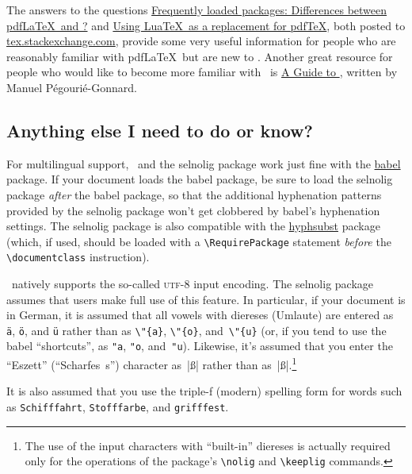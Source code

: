 \documentclass[12pt]{article}
\newcommand{\pkg}[1]{\textsf{#1}}
\newcommand{\cmmd}[1]{\texttt{\textbackslash #1}}
\begin{document}
The answers to the questions \href{http://tex.stackexchange.com/q/28642/5001}{Frequently loaded packages: Differences between pdf\LaTeX\ and \LuaLaTeX?} and \href{http://tex.stackexchange.com/q/32295/5001}{Using Lua\TeX\ as a replacement for pdf\TeX}, both posted to \href{http://tex.stackexchange.com/}{tex.stackexchange.com}, provide some very useful information for people who are reasonably familiar with pdf\LaTeX\ but are new to \LuaLaTeX. Another great resource for people who would like to become more familiar with \LuaLaTeX\ is  \href{http://mirror.ctan.org/info/luatex/lualatex-doc/lualatex-doc.pdf}{A Guide to \LuaLaTeX}, written by Manuel Pégourié-Gonnard.


\subsection{Anything else I need to do or know?} \label{sec:anythingelse}

For multilingual support, \LuaLaTeX\ and the \pkg{selnolig} package work just fine with the \href{http://www.ctan.org/pkg/babel}{\pkg{babel}} package. If your document loads the \pkg{babel} package, be sure to load the \pkg{selnolig} package \emph{after} the \pkg{babel} package, so that the additional hyphenation patterns provided by the \pkg{selnolig} package won't get clobbered by \pkg{babel}'s hyphenation settings. The \pkg{selnolig} package is also compatible with the \href{http://www.ctan.org/pkg/hyphsubst}{\pkg{hyphsubst}} package (which, if used, should be loaded with a \Verb+\RequirePackage+ statement \emph{before} the \Verb+\documentclass+ instruction).

\LuaLaTeX\ natively supports the so-called \textsc{utf}-8 input encoding. The \pkg{selnolig} package assumes that users make full use of this feature. In particular, if your document is in German, it is assumed that all vowels with diereses (Umlaute) are entered as \Verb|ä|, \Verb|ö|, and \Verb|ü| rather than as \Verb|\"{a}|, \Verb|\"{o}|, and~\Verb|\"{u}| (or, if you tend to use the \pkg{babel} \enquote{shortcuts}, as \Verb|"a|, \Verb|"o|, and~\Verb|"u|). Likewise, it's assumed that you enter the \enquote{Eszett} (\enquote{Scharfes~s}) character as~|ß| rather than as~|{\ss}|.\footnote{The use of the input characters with \enquote{built-in} diereses is actually required only for the operations of the package's \cmmd{nolig} and \cmmd{keeplig} commands.}

It is also assumed that you use the triple-f (modern) spelling form for words such as \texttt{Schifffahrt}, \texttt{Stofffarbe}, and \texttt{grifffest}.
\end{document}
